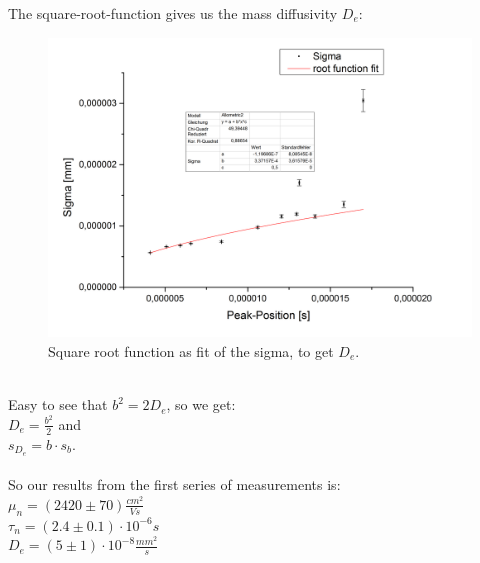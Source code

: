 \newpage
The square-root-function gives us the mass diffusivity $\mathit{D_{e}}$:
\begin{figure}[h]
\begin{center}
\includegraphics[scale=0.5]{Bilder/t2_1_sigma}
\caption{Square root function as fit of the sigma, to get $\mathit{D_{e}}$. }
\label{fig:1sigma}
\end{center}
\end{figure}\\
Easy to see that $\mathit{b^2= 2 D_{e}}$, so we get:\\
$\mathit{D_{e}=\frac{b^2}{2}}$ and \\
$\mathit{s_{D_{e}}=b\cdot s_{b}}$.\\
\\
So our results from the first series of measurements is:\\

$\mathit{\mu_{n}=(2420\pm70)\frac{cm^{2}}{Vs}}$\\

$\mathit{\tau_{n}=(2.4\pm0.1)\cdot10^{-6}s}$\\

$\mathit{D_{e}=(5\pm1)\cdot10^{-8}\frac{mm^{2}}{s}}$
\newpage

